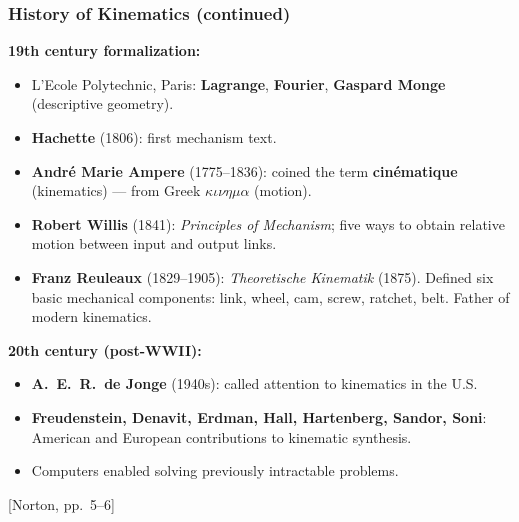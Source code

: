 \documentclass[10pt,aspectratio=43]{beamer}
\newcommand{\pref}[1]{\vfill\hfill{\scriptsize\color{gray}[Norton, pp.~#1]}}
\begin{document}
\begin{frame}
\frametitle{History of Kinematics (continued)}

\textbf{19th century formalization:}
\begin{itemize}
  \item L'Ecole Polytechnic, Paris: \textbf{Lagrange}, \textbf{Fourier}, \textbf{Gaspard Monge} (descriptive geometry).
  \item \textbf{Hachette} (1806): first mechanism text.
  \item \textbf{Andr\'e Marie Ampere} (1775--1836): coined the term \textbf{cin\'ematique} (kinematics) --- from Greek $\kappa\iota\nu\eta\mu\alpha$ (motion).
  \item \textbf{Robert Willis} (1841): \emph{Principles of Mechanism}; five ways to obtain relative motion between input and output links.
  \item \textbf{Franz Reuleaux} (1829--1905): \emph{Theoretische Kinematik} (1875). Defined six basic mechanical components: link, wheel, cam, screw, ratchet, belt. Father of modern kinematics.
\end{itemize}

\vspace{4pt}
\textbf{20th century (post-WWII):}
\begin{itemize}
  \item \textbf{A.\ E.\ R.\ de Jonge} (1940s): called attention to kinematics in the U.S.
  \item \textbf{Freudenstein, Denavit, Erdman, Hall, Hartenberg, Sandor, Soni}: American and European contributions to kinematic synthesis.
  \item Computers enabled solving previously intractable problems.
\end{itemize}
\pref{5--6}
\end{frame}

\end{document}
